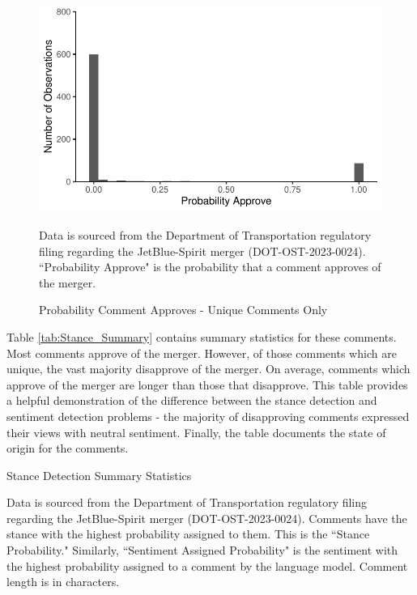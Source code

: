 \documentclass{article}
\begin{document}
\begin{appendices}
	\begin{figure}
		\caption{Probability Comment Approves - Unique Comments Only}
		\label{fig:ProbabilityApprove_Unique}
        \begin{center}
            \includegraphics{05.Figures/stance_strength_unique.pdf}
        \end{center}
				\begin{minipage}{\textwidth} 
			{\footnotesize Data is sourced from the Department of Transportation regulatory filing regarding the JetBlue-Spirit merger (DOT-OST-2023-0024). ``Probability Approve" is the probability that a comment approves of the merger.} 
		\end{minipage}
	\end{figure}


Table \ref{tab:Stance_Summary} contains summary statistics for these comments. Most comments approve of the merger. However, of those comments which are unique, the vast majority disapprove of the merger. On average, comments which approve of the merger are longer than those that disapprove. This table provides a helpful demonstration of the difference between the stance detection and sentiment detection problems -  the majority of disapproving comments expressed their views with neutral sentiment. Finally, the table documents the state of origin for the comments. 

\begin{table}[h]
    \caption{Stance Detection Summary Statistics}
    \label{tab:Stance_Summary}
    
    \begin{minipage}{\textwidth} 
        {\footnotesize Data is sourced from the Department of Transportation regulatory filing regarding the JetBlue-Spirit merger  (DOT-OST-2023-0024). Comments have the stance with the highest probability assigned to them. This is the ``Stance Probability." Similarly, ``Sentiment Assigned Probability" is the sentiment with the highest  probability assigned to a comment by the language model. Comment length is in characters.} 
    \end{minipage}
\end{table}


\end{appendices}
\end{document}
